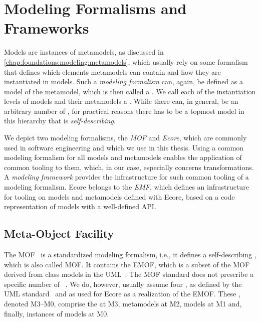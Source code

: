 \section{Modeling Formalisms and Frameworks}
\label{chap:foundations:formalisms}

Models are instances of metamodels, as discussed in \autoref{chap:foundations:modeling:metamodels}, which usually rely on some formalism that defines which elements metamodels can contain and how they are instantiated in models.
Such a \emph{modeling formalism} can, again, be defined as a model of the metamodel, which is then called a \emph{\metametamodel}.
We call each of the instantiation levels of models and their metamodels a \emph{\metalevel}.
While there can, in general, be an arbitrary number of \metalevels, for practical reasons there has to be a topmost model in this hierarchy that is \emph{self-describing}.

We depict two modeling formalisms, the \emph{\acrlong{MOF}} and \emph{Ecore}, which are commonly used in software engineering and which we use in this thesis.
Using a common modeling formalism for all models and metamodels enables the application of common tooling to them, which, in our case, especially concerns transformations.
A \emph{modeling framework} provides the infrastructure for such common tooling of a modeling formalism.
Ecore belongs to the \emph{\acrlong{EMF}}, which defines an infrastructure for tooling on models and metamodels defined with Ecore, based on a code representation of models with a well-defined \gls{API}.


\subsection{Meta-Object Facility}
\label{chap:foundations:formalisms:mof}

The \gls{MOF}~\cite{mof} is a standardized modeling formalism, i.e., it defines a self-describing \metametamodel, which is also called \gls{MOF}.
It contains the \gls{EMOF}, which is a subset of the \gls{MOF} derived from class models in the \gls{UML}~\cite{uml}.
The \gls{MOF} standard does not prescribe a specific number of \metalevels~\cite[Sec.~7.3]{mof}.
We do, however, usually assume four \metalevels, as defined by the \gls{UML} standard~\cite{uml} and as used for Ecore as a realization of the \gls{EMOF}.
These \metalevels, denoted M3--M0, comprise the \metametamodel at M3, metamodels at M2, models at M1 and, finally, instances of models at M0.

